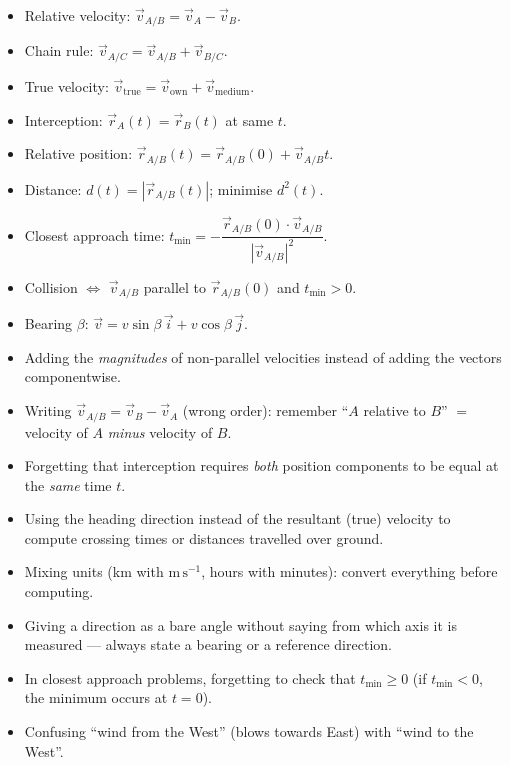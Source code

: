 \documentclass[11pt]{article}
\begin{document}
\begin{aretenir}
\begin{itemize}
\item Relative velocity: $\vec{v}_{A/B} = \vec{v}_A - \vec{v}_B$.
\item Chain rule: $\vec{v}_{A/C} = \vec{v}_{A/B} + \vec{v}_{B/C}$.
\item True velocity: $\vec{v}_{\text{true}} = \vec{v}_{\text{own}} + \vec{v}_{\text{medium}}$.
\item Interception: $\vec{r}_A(t) = \vec{r}_B(t)$ at same $t$.
\item Relative position: $\vec{r}_{A/B}(t) = \vec{r}_{A/B}(0) + \vec{v}_{A/B}t$.
\item Distance: $d(t) = |\vec{r}_{A/B}(t)|$; minimise $d^2(t)$.
\item Closest approach time: $t_{\min} = -\dfrac{\vec{r}_{A/B}(0)\cdot\vec{v}_{A/B}}{|\vec{v}_{A/B}|^2}$.
\item Collision $\Leftrightarrow$ $\vec{v}_{A/B}$ parallel to $\vec{r}_{A/B}(0)$ and $t_{\min} > 0$.
\item Bearing $\beta$: $\vec{v} = v\sin\beta\,\vec{i} + v\cos\beta\,\vec{j}$.
\end{itemize}
\end{aretenir}

\begin{attention}
\begin{itemize}
\item Adding the \emph{magnitudes} of non-parallel velocities instead of adding the vectors componentwise.
\item Writing $\vec{v}_{A/B} = \vec{v}_B - \vec{v}_A$ (wrong order): remember ``$A$ relative to $B$'' $=$ velocity of $A$ \emph{minus} velocity of $B$.
\item Forgetting that interception requires \emph{both} position components to be equal at the \emph{same} time $t$.
\item Using the heading direction instead of the resultant (true) velocity to compute crossing times or distances travelled over ground.
\item Mixing units (km with $\mathrm{m\,s^{-1}}$, hours with minutes): convert everything before computing.
\item Giving a direction as a bare angle without saying from which axis it is measured — always state a bearing or a reference direction.
\item In closest approach problems, forgetting to check that $t_{\min} \ge 0$ (if $t_{\min} < 0$, the minimum occurs at $t=0$).
\item Confusing ``wind from the West'' (blows towards East) with ``wind to the West''.
\end{itemize}
\end{attention}
\end{document}
